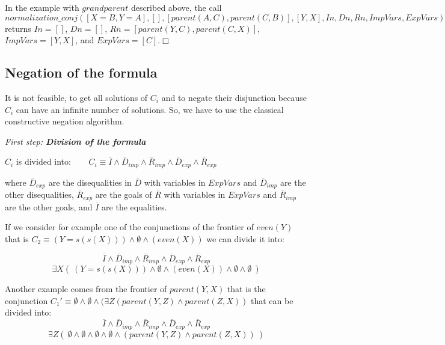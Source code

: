 \documentclass{tlp}
\begin{document}
\begin{itemize}
In the example with $grandparent$ described above, the call 
$normalization\_conj([X=B,Y=A],[],[parent(A,C),parent(C,B)],[Y,X],In,Dn,Rn,ImpVars,ExpVars)$
returns $In=[]$, $Dn=[]$, $Rn=[parent(Y,C),parent(C,X)]$, $ImpVars=[Y,X]$, and
$ExpVars=[C]$.$\Box$
 \end{itemize}  
 

\vspace{-0.1in}

\subsection{Negation of the formula}
\label{negation}

It is not feasible, to get all solutions of $C_i$ and to negate their
disjunction because $C_i$ can have an infinite number of solutions. So,
we have to use the classical constructive negation algorithm.

\medskip

\noindent
{\em First step: {\bf Division of the formula}}

\noindent
$C_i$ is divided into: $~~~~~~~~C_i \equiv \overline{I} \wedge
        \overline{D}_{imp} \wedge \overline{R}_{imp} \wedge
        \overline{D}_{exp} \wedge \overline{R}_{exp} $

\noindent
where $\overline{D}_{exp}$ are the disequalities in $\overline{D}$
with variables in $ExpVars$ and $\overline{D}_{imp}$ are the other
disequalities, $\overline{R}_{exp}$ are the goals of $\overline{R}$
with variables in $ExpVars$ and $\overline{R}_{imp}$ are the other
goals, and $\overline{I}$ are the equalities.

If we consider for example one of the conjunctions of the frontier of
$even(Y)$ that is $C_2 \equiv ( Y=s(s(X)) ) \wedge \emptyset \wedge ( even(X)
)$ we can divide it into:

\[\overline{I} \wedge
        \overline{D}_{imp} \wedge \overline{R}_{imp} \wedge
        \overline{D}_{exp} \wedge \overline{R}_{exp} \]
\[\exists X (~ ( Y=s(s(X)) )
       \wedge \emptyset \wedge ( even(X))  \wedge \emptyset \wedge \emptyset~) \]

Another example comes from the frontier of $parent(Y,X)$ that is the
conjunction $C_1' \equiv \emptyset \wedge \emptyset \wedge (\exists Z
(parent(Y,Z) \wedge parent(Z,X) )$ that can be divided into:
\[\overline{I} \wedge
        \overline{D}_{imp} \wedge \overline{R}_{imp} \wedge
        \overline{D}_{exp} \wedge \overline{R}_{exp}  \]
\[\exists Z (~ \emptyset
        \wedge \emptyset \wedge \emptyset  \wedge \emptyset \wedge 
(parent(Y,Z) \wedge parent(Z,X) ) ~) \]
\end{document}
